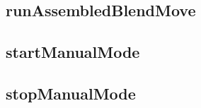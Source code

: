 \hypertarget{index_runAssembledBlendMove}{}\subsection{run\+Assembled\+Blend\+Move}\label{index_runAssembledBlendMove}
\hypertarget{index_startManualMode}{}\subsection{start\+Manual\+Mode}\label{index_startManualMode}
\hypertarget{SMD_Constants.h_stopManualMode}{}\subsection{stop\+Manual\+Mode}\label{SMD_Constants.h_stopManualMode}
